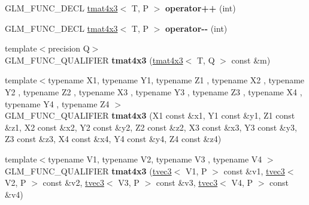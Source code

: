 \begin{DoxyCompactItemize}
\item 
\hypertarget{structglm_1_1detail_1_1tmat4x3_a90dedf83f52b14d6b533aafd568f27d3}{G\-L\-M\-\_\-\-F\-U\-N\-C\-\_\-\-D\-E\-C\-L \hyperlink{structglm_1_1detail_1_1tmat4x3}{tmat4x3}$<$ T, P $>$ {\bfseries operator++} (int)}\label{structglm_1_1detail_1_1tmat4x3_a90dedf83f52b14d6b533aafd568f27d3}

\item 
\hypertarget{structglm_1_1detail_1_1tmat4x3_ad1aa81d8abbe5ee270d0ad6b90b12899}{G\-L\-M\-\_\-\-F\-U\-N\-C\-\_\-\-D\-E\-C\-L \hyperlink{structglm_1_1detail_1_1tmat4x3}{tmat4x3}$<$ T, P $>$ {\bfseries operator-\/-\/} (int)}\label{structglm_1_1detail_1_1tmat4x3_ad1aa81d8abbe5ee270d0ad6b90b12899}

\item 
\hypertarget{structglm_1_1detail_1_1tmat4x3_a75a5dd17c1376eaaf218a98be462222d}{{\footnotesize template$<$precision Q$>$ }\\G\-L\-M\-\_\-\-F\-U\-N\-C\-\_\-\-Q\-U\-A\-L\-I\-F\-I\-E\-R {\bfseries tmat4x3} (\hyperlink{structglm_1_1detail_1_1tmat4x3}{tmat4x3}$<$ T, Q $>$ const \&m)}\label{structglm_1_1detail_1_1tmat4x3_a75a5dd17c1376eaaf218a98be462222d}

\item 
\hypertarget{structglm_1_1detail_1_1tmat4x3_a8b97a242c1d393f68f96995318bb0247}{{\footnotesize template$<$typename X1, typename Y1, typename Z1 , typename X2 , typename Y2 , typename Z2 , typename X3 , typename Y3 , typename Z3 , typename X4 , typename Y4 , typename Z4 $>$ }\\G\-L\-M\-\_\-\-F\-U\-N\-C\-\_\-\-Q\-U\-A\-L\-I\-F\-I\-E\-R {\bfseries tmat4x3} (X1 const \&x1, Y1 const \&y1, Z1 const \&z1, X2 const \&x2, Y2 const \&y2, Z2 const \&z2, X3 const \&x3, Y3 const \&y3, Z3 const \&z3, X4 const \&x4, Y4 const \&y4, Z4 const \&z4)}\label{structglm_1_1detail_1_1tmat4x3_a8b97a242c1d393f68f96995318bb0247}

\item 
\hypertarget{structglm_1_1detail_1_1tmat4x3_a855ee129fe5ef20aa994a3121996b09a}{{\footnotesize template$<$typename V1, typename V2, typename V3 , typename V4 $>$ }\\G\-L\-M\-\_\-\-F\-U\-N\-C\-\_\-\-Q\-U\-A\-L\-I\-F\-I\-E\-R {\bfseries tmat4x3} (\hyperlink{structglm_1_1detail_1_1tvec3}{tvec3}$<$ V1, P $>$ const \&v1, \hyperlink{structglm_1_1detail_1_1tvec3}{tvec3}$<$ V2, P $>$ const \&v2, \hyperlink{structglm_1_1detail_1_1tvec3}{tvec3}$<$ V3, P $>$ const \&v3, \hyperlink{structglm_1_1detail_1_1tvec3}{tvec3}$<$ V4, P $>$ const \&v4)}\label{structglm_1_1detail_1_1tmat4x3_a855ee129fe5ef20aa994a3121996b09a}


\end{DoxyCompactItemize}
